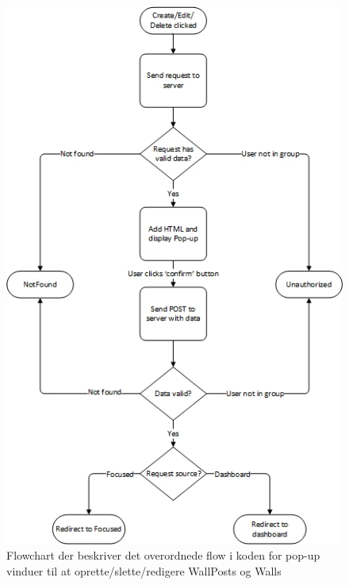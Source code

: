 \begin{figure}[H]
  \includegraphics[width=0.8\linewidth]{01_Billeder/10_Design_og_implementering/Wall_Flow.jpg}
  \centering
  \caption{Flowchart der beskriver det overordnede flow i koden for pop-up vinduer til at oprette/slette/redigere WallPosts og Walls}
  \label{fig:Wall_Flow}
\end{figure}


